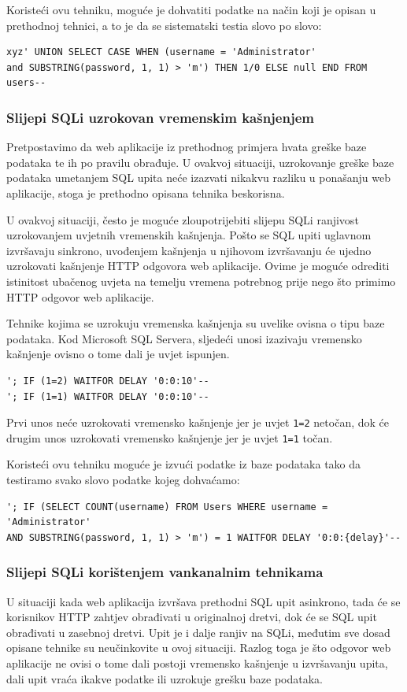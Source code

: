 \documentclass[12pt, oneside, onecolumn]{book}
\begin{document}
{Koristeći ovu tehniku, moguće je dohvatiti podatke na način koji je opisan u prethodnoj tehnici, a to je da se sistematski testia slovo po slovo:

\begin{verbatim}
xyz' UNION SELECT CASE WHEN (username = 'Administrator' 
and SUBSTRING(password, 1, 1) > 'm') THEN 1/0 ELSE null END FROM users--
\end{verbatim}

\subsubsection{Slijepi SQLi uzrokovan vremenskim kašnjenjem}
Pretpostavimo da web aplikacije iz prethodnog primjera hvata greške baze podataka te ih po pravilu obrađuje. U ovakvoj situaciji, uzrokovanje greške baze podataka umetanjem SQL upita neće izazvati nikakvu razliku u ponašanju web aplikacije, stoga je prethodno opisana tehnika beskorisna.

U ovakvoj situaciji, često je moguće zloupotrijebiti slijepu SQLi ranjivost uzrokovanjem uvjetnih vremenskih kašnjenja. Pošto se SQL upiti uglavnom izvršavaju sinkrono, uvođenjem kašnjenja u njihovom izvršavanju će ujedno uzrokovati kašnjenje HTTP odgovora web aplikacije. Ovime je moguće odrediti istinitost ubačenog uvjeta na temelju vremena potrebnog prije nego što primimo HTTP odgovor web aplikacije.

Tehnike kojima se uzrokuju vremenska kašnjenja su uvelike ovisna o tipu baze podataka. Kod Microsoft SQL Servera, sljedeći unosi izazivaju vremensko kašnjenje ovisno o tome dali je uvjet ispunjen.

\begin{verbatim}
'; IF (1=2) WAITFOR DELAY '0:0:10'--
'; IF (1=1) WAITFOR DELAY '0:0:10'--
\end{verbatim}

Prvi unos neće uzrokovati vremensko kašnjenje jer je uvjet \texttt{1=2} netočan, dok će drugim unos uzrokovati vremensko kašnjenje jer je uvjet \texttt{1=1} točan.

Koristeći ovu tehniku moguće je izvući podatke iz baze podataka tako da testiramo svako slovo podatke kojeg dohvaćamo:

\begin{verbatim}
'; IF (SELECT COUNT(username) FROM Users WHERE username = 'Administrator' 
AND SUBSTRING(password, 1, 1) > 'm') = 1 WAITFOR DELAY '0:0:{delay}'--
\end{verbatim}

\subsubsection{Slijepi SQLi korištenjem vankanalnim tehnikama}
U situaciji kada web aplikacija izvršava prethodni SQL upit asinkrono, tada će se korisnikov HTTP zahtjev obrađivati u originalnoj dretvi, dok će se SQL upit obrađivati u zasebnoj dretvi. Upit je i dalje ranjiv na SQLi, međutim sve dosad opisane tehnike su neučinkovite u ovoj situaciji. Razlog toga je što odgovor web aplikacije ne ovisi o tome dali postoji vremensko kašnjenje u izvršavanju upita, dali upit vraća ikakve podatke ili uzrokuje grešku baze podataka.

}
\end{document}
